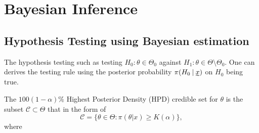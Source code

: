 \chapter{Bayesian Inference}

\section{Hypothesis Testing using Bayesian estimation}

The hypothesis testing such as testing $H_0:\theta \in \Theta_0$ against $H_1 : \theta \in \Theta \setminus \Theta_0$.
One can derives the testing rule using the posterior probability $\pi(H_0 \> | \> \undertilde{x})$ on $H_0$ being true.

\begin{definition}
    The $100(1-\alpha)\%$ Highest Posterior Density (HPD) credible set for $\theta$ is 
    the subset $\mathcal{C} \subset \Theta$ that in the form of 
    \begin{equation}
        \mathcal{C} = \{ \theta \in \Theta : \pi(\theta|x) \geq K(\alpha) \},
    \end{equation}
    where 
\end{definition}


